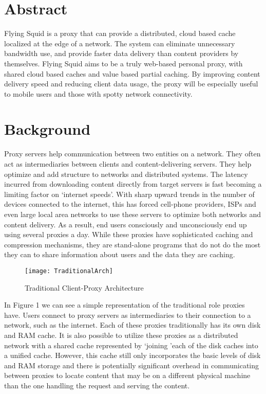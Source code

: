 \section{Abstract}

Flying Squid is a proxy that can provide a distributed, cloud based cache localized at the edge of a network. The system can eliminate unnecessary bandwidth use, and provide faster data delivery than content providers by themselves. Flying Squid aims to be a truly web-based personal proxy, with shared cloud based caches and value based partial caching. By improving content delivery speed and reducing client data usage, the proxy will be especially useful to mobile users and those with spotty network connectivity.

\section{Background}

Proxy servers help communication between two entities on a network. They often act as intermediaries between clients and content-delivering servers. They help optimize and add structure to networks and distributed systems. The latency incurred from downloading content directly from target servers is fast becoming a limiting factor on ‘internet speeds’. With sharp upward trends in the number of devices connected to the internet, this has forced cell-phone providers, ISPs and even large local area networks to use these servers to optimize both networks and content delivery. As a result, end users consciously and unconsciously end up using several proxies a day. While these proxies have sophisticated caching and compression mechanisms, they are stand-alone programs that do not do the most they can to share information about users and the data they are caching.

\begin{figure}[H] \centering
\texttt{[image: TraditionalArch]}
\caption{Traditional Client-Proxy Architecture}
\end{figure}


In Figure 1 we can see a simple representation of the traditional role proxies have. Users connect to proxy servers as intermediaries to their connection to a network, such as the internet. Each of these proxies traditionally has its own disk and RAM cache. It is also possible to utilize these proxies as a distributed network with a shared cache represented by \lq joining \rq each of the disk caches into a unified cache. However, this cache still only incorporates the basic levels of disk and RAM storage and there is potentially significant overhead in communicating between proxies to locate content that may be on a different physical machine than the one handling the request and serving the content.



